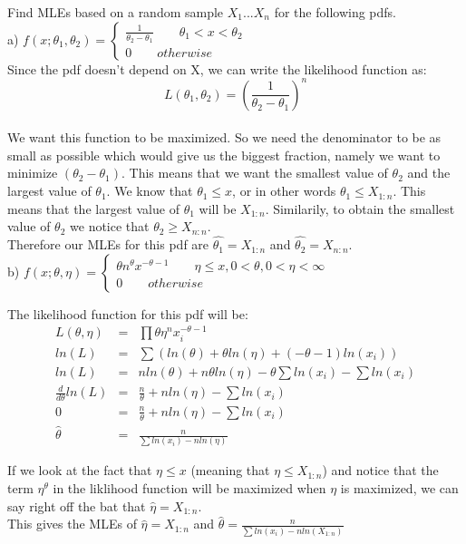  Find MLEs based on a random sample $X_{1}...X_{n}$ for the following pdfs. \\
\noindent a) $f(x; \theta_{1},\theta_{2} )=\begin{cases} \frac{1}{\theta_{2}-\theta_{1}} \qquad \theta_{1}<x<\theta_{2} 
\\0\qquad otherwise \end{cases}$
\\Since the pdf doesn't depend on X, we can write the likelihood function as:
\begin{equation}L(\theta_1, \theta_2)=\left( \frac{1}{\theta_2 - \theta_1}\right)^n \nonumber \end{equation}
\\We want this function to be maximized. So we need the denominator to be as small as possible which would give us the biggest fraction, namely we want to minimize $(\theta_2 -\theta_1)$. This means that we want the smallest value of $\theta_2$ and the largest value of $\theta_1$. We know that $\theta_1 \le x$, or in other words $\theta_1 \le X_{1:n}$. This means that the largest value of $\theta_1$ will be $X_{1:n}$. Similarily, to obtain the smallest value of $\theta_2$ we notice that $\theta_2 \ge X_{n:n}$.
\\Therefore our MLEs for this pdf are $\hat{\theta_1}=X_{1:n}$ and $\hat{\theta_2}=X_{n:n}$.\\

 b) $f(x;\theta, \eta )=\begin{cases} \theta n^{\theta}x^{-\theta-1}\qquad \eta \le x, 0<\theta, 0<\eta<\infty \\ 0\qquad otherwise \end{cases}$

The likelihood function for this pdf will be:
\begin{eqnarray*} L(\theta,\eta) &=& \prod \theta \eta^n x_i^{-\theta-1}\\
ln(L) &=& \sum(ln(\theta)+\theta ln(\eta)+(-\theta-1)ln(x_i))\\
ln(L) &=& nln(\theta)+n\theta ln(\eta)-\theta\sum ln(x_i)-\sum ln(x_i)\\
\frac{d}{d\theta}ln(L) &=& \frac{n}{\theta}+n ln(\eta)-\sum ln(x_i)\\
0 &=& \frac{n}{\theta}+n ln(\eta)-\sum ln(x_i)\\
\hat{\theta} &=& \frac{n}{\sum ln(x_i) - n ln(\eta)}
\end{eqnarray*}

\noindent If we look at the fact that $\eta \le x$ (meaning that $\eta \le X_{1:n}$) and notice that the term $\eta^\theta$ in the liklihood function will be maximized when $\eta$ is maximized, we can say right off the bat that $\hat{\eta}=X_{1:n}$.
\\This gives the MLEs of $\hat{\eta}=X_{1:n}$ and $\hat{\theta}=\frac{n}{\sum ln(x_i) - n ln(X_{1:n})}$ \\


